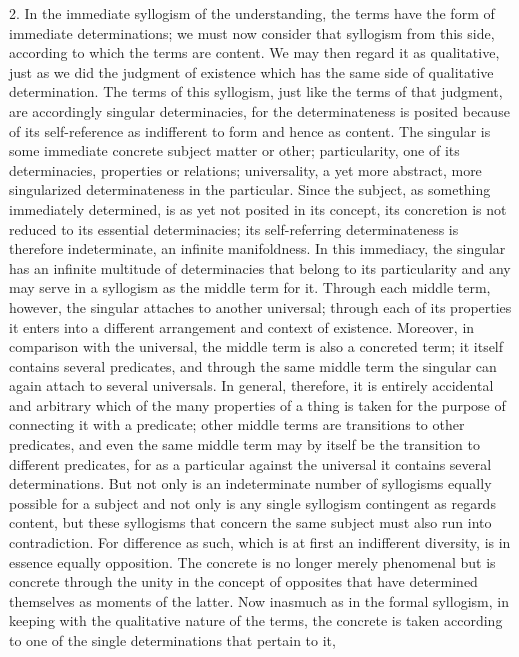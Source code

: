 2. In the immediate syllogism of the understanding,
the terms have the form of immediate determinations;
we must now consider that syllogism from this side,
according to which the terms are content.
We may then regard it as qualitative,
just as we did the judgment of existence
which has the same side of qualitative determination.
The terms of this syllogism,
just like the terms of that judgment,
are accordingly singular determinacies,
for the determinateness is posited
because of its self-reference as indifferent to form
and hence as content.
The singular is some immediate concrete subject matter or other;
particularity, one of its determinacies, properties or relations;
universality, a yet more abstract, more singularized
determinateness in the particular.
Since the subject, as something immediately determined,
is as yet not posited in its concept,
its concretion is not reduced to its essential determinacies;
its self-referring determinateness is therefore
indeterminate, an infinite manifoldness.
In this immediacy, the singular
has an infinite multitude of determinacies
that belong to its particularity
and any may serve in a syllogism as the middle term for it.
Through each middle term, however,
the singular attaches to another universal;
through each of its properties it enters into
a different arrangement and context of existence.
Moreover, in comparison with the universal,
the middle term is also a concreted term;
it itself contains several predicates,
and through the same middle term
the singular can again attach to several universals.
In general, therefore, it is entirely accidental and arbitrary
which of the many properties of a thing is taken
for the purpose of connecting it with a predicate;
other middle terms are transitions to other predicates,
and even the same middle term may by itself be
the transition to different predicates,
for as a particular against the universal
it contains several determinations.
But not only is an indeterminate number of
syllogisms equally possible for a subject
and not only is any single syllogism
contingent as regards content,
but these syllogisms that concern the same subject
must also run into contradiction.
For difference as such,
which is at first an indifferent diversity,
is in essence equally opposition.
The concrete is no longer merely phenomenal
but is concrete through the unity in the concept of opposites
that have determined themselves as moments of the latter.
Now inasmuch as in the formal syllogism,
in keeping with the qualitative nature of the terms,
the concrete is taken according to
one of the single determinations that pertain to it,

